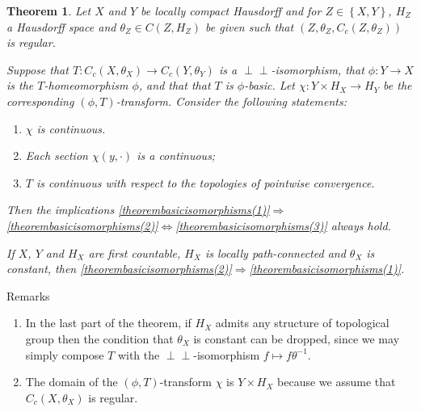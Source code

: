 \documentclass[letter,11pt]{amsart}
\theoremstyle{plain}		\newtheorem{theorem}[generalnumbering]{Theorem}
\theoremstyle{plain}		\newtheorem{corollary}[generalnumbering]{Corollary}
\theoremstyle{definition}		\newtheorem{definition}[generalnumbering]{Definition}
\theoremstyle{definition}		\newtheorem{example}[generalnumbering]{Example}
\theoremstyle{plain}		\newtheorem{proposition}[generalnumbering]{Proposition}
\theoremstyle{plain}		\newtheorem{lemma}[generalnumbering]{Lemma}
\theoremstyle{plain}    \newtheorem{plainstyle}[generalnumbering]{\namefordifferentenvironment}
\theoremstyle{plain}    \newtheorem*{plainstyle*}{\namefordifferentenvironment}
\theoremstyle{definition}    \newtheorem{definitionstyle}[generalnumbering]{\namefordifferentenvironment}
\theoremstyle{definition}    \newtheorem*{definitionstyle*}{\namefordifferentenvironment}
\newcommand{\namefordifferentenvironment}{}
\newenvironment{denv*}[1]{\renewcommand{\namefordifferentenvironment}{#1}\begin{definitionstyle*}}{\end{definitionstyle*}}
\newcommand{\perpp}{\perp\!\!\!\perp}
\begin{document}
\begin{theorem}\label{theorembasicisomorphisms}
	Let $X$ and $Y$ be locally compact Hausdorff and for $Z\in\left\{X,Y\right\}$, $H_Z$ a Hausdorff space and $\theta_Z\in C(Z,H_Z)$ be given such that $(Z,\theta_Z,C_c(Z,\theta_Z))$ is regular.
	
	Suppose that $T\colon C_c(X,\theta_X)\to C_c(Y,\theta_Y)$ is a $\perpp$-isomorphism, that $\phi\colon Y\to X$ is the $T$-homeomorphism $\phi$, and that that $T$ is $\phi$-basic. Let $\chi\colon Y\times H_X\to H_Y$ be the corresponding $(\phi,T)$-transform. Consider the following statements:
	\begin{enumerate}[label=(\roman*)]
		\item\label{theorembasicisomorphisms(1)} $\chi$ is continuous.
		\item\label{theorembasicisomorphisms(2)} Each section $\chi(y,\cdot)$ is a continuous;
		\item\label{theorembasicisomorphisms(3)} $T$ is continuous with respect to the topologies of pointwise convergence.
	\end{enumerate}
	Then the implications \ref{theorembasicisomorphisms(1)}$\Rightarrow$\ref{theorembasicisomorphisms(2)}$\iff$\ref{theorembasicisomorphisms(3)} always hold.
	
	If $X$, $Y$ and $H_X$ are first countable, $H_X$ is locally path-connected and $\theta_X$ is constant, then \ref{theorembasicisomorphisms(2)}$\Rightarrow$\ref{theorembasicisomorphisms(1)}.
\end{theorem}

\begin{denv*}{Remarks}
	\begin{enumerate}[label=(\arabic*)]
		\item In the last part of the theorem, if $H_X$ admits any structure of topological group then the condition that $\theta_X$ is constant can be dropped, since we may simply compose $T$ with the $\perpp$-isomorphism $f\mapsto f\theta^{-1}$.
		\item The domain of the $(\phi,T)$-transform $\chi$ is $Y\times H_X$ because we assume that $C_c(X,\theta_X)$ is regular.
	\end{enumerate}
\end{denv*}
\end{document}
